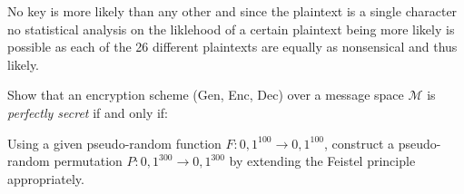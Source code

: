 \documentclass{supervision}
\begin{document}
\begin{questions}
      \begin{solution}
        No key is more likely than any other and since the plaintext is a
        single character no statistical analysis on the liklehood of a certain
        plaintext being more likely is possible as each of the 26 different
        plaintexts are equally as nonsensical and thus likely.
      \end{solution}

    \question Show that an encryption scheme (Gen, Enc, Dec) over a message
      space $\mathcal{M}$ is \emph{perfectly secret} if and only if:


    \question Using a given pseudo-random function $F : {0,1}^{100} \rightarrow
      {0,1}^{100}$, construct a pseudo-random permutation $P: {0,1}^{300}
      \rightarrow {0,1}^{300}$ by extending the Feistel principle appropriately.


\end{questions}
\end{document}
